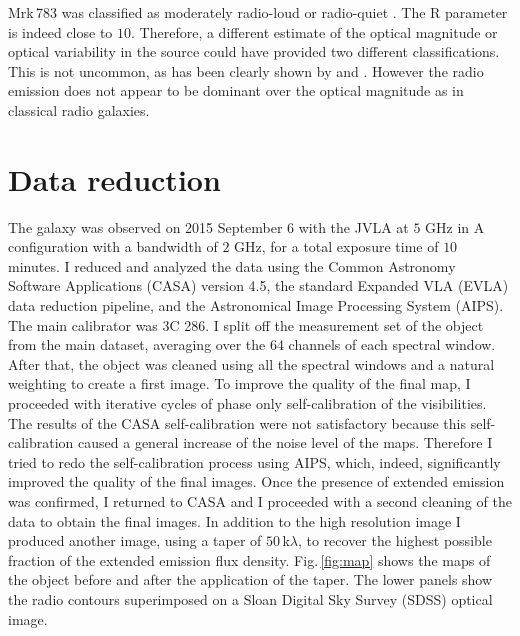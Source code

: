 \documentclass[../main.tex]{subfiles}
\begin{document}
Mrk\,783 was classified as moderately radio-loud \citep{Berton15a} or radio-quiet \citep{Doi13}. 
The R parameter is indeed close to $10$. 
Therefore, a different estimate of the optical magnitude or optical variability in the source could have provided two different classifications. 
This is not uncommon, as has been clearly shown by \citet{Ho01} and \citet{Kharb14}.
However the radio emission does not appear to be dominant over the optical magnitude as in classical radio galaxies.




\section{Data reduction}
\label{sec:datared_casa}

The galaxy was observed on 2015 September 6 with the JVLA at $5$ GHz in A configuration with a bandwidth of $2$ GHz, for a total exposure time of $10$ minutes.
I reduced and analyzed the data using the Common Astronomy Software Applications (CASA) version 4.5, the standard Expanded VLA (EVLA) data reduction pipeline, and the Astronomical Image Processing System (AIPS).
The main calibrator was 3C 286. 
I split off the measurement set of the object from the main dataset, averaging over the $64$ channels of each spectral window.
After that, the object was cleaned using all the spectral windows and a natural weighting to create a first image.
To improve the quality of the final map, I proceeded with iterative cycles of phase only self-calibration of the visibilities.
The results of the CASA self-calibration were not satisfactory because this self-calibration caused a general increase of the noise level of the maps.
Therefore I tried to redo the self-calibration process using AIPS, which, indeed, significantly improved the quality of the final images.
Once the presence of extended emission was confirmed, I returned to CASA and I proceeded with a second cleaning of the data to obtain the final images.
In addition to the high resolution image I produced another image, using a taper of $50\,$k$\lambda$, to recover the highest possible fraction of the extended emission flux density.
Fig.\,\ref{fig:map} shows the maps of the object before and after the application of the taper.  
The lower panels show the radio contours superimposed on a Sloan Digital Sky Survey (SDSS) optical image.
\end{document}
